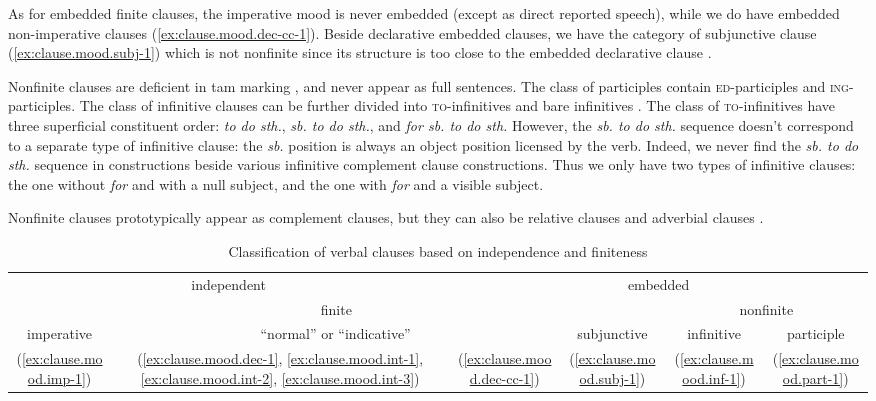 \documentclass[UTF8, a4paper, oneside, scheme=plain, 12pt]{ctexbook}
\newcommand*{\citesec}[1]{\S~{#1}}
\newcommand*{\citechap}[1]{Ch~{#1}}
\newcommand*{\citepage}[1]{p.~{#1}}
\newcommand{\form}[1]{\emph{#1}}
\newcommand{\formcat}[1]{\textsc{#1}}
\begin{document}
As for embedded finite clauses,
the imperative mood is never embedded (except as direct reported speech),
while we do have embedded non-imperative clauses (\ref{ex:clause.mood.dec-cc-1}).
Beside declarative embedded clauses,
we have the category of subjunctive clause (\ref{ex:clause.mood.subj-1})
which is not nonfinite 
since its structure is too close to 
the embedded declarative clause \citep[\citepage{83}]{cgel}. 

Nonfinite clauses are deficient in \acs{tam} marking 
\citep[\citepage{1174}, {[5-7]}]{cgel},
and never appear as full sentences.
The class of participles contain \formcat{ed}-participles and \formcat{ing}-participles.
The class of infinitive clauses can be further divided into 
\formcat{to}-infinitives and bare infinitives \citet[\citechap{14}, \citesec{1.4.3}]{cgel}.
The class of \formcat{to}-infinitives have three superficial constituent order:
\form{to do sth.}, \form{sb. to do sth.}, and \form{for sb. to do sth.}
However, the \form{sb. to do sth.} sequence doesn't correspond to a separate type of infinitive clause:
the \form{sb.} position is always an object position licensed by the verb.
Indeed, we never find the \form{sb. to do sth.} sequence
in constructions beside various infinitive complement clause constructions.
Thus we only have two types of infinitive clauses:
the one without \form{for} and with a null subject,
and the one with \form{for} and a visible subject.

Nonfinite clauses prototypically appear as complement clauses, 
but they can also be relative clauses and adverbial clauses \citep[\citepage{1264}]{cgel}.

\begin{table}[H]
    \caption{Classification of verbal clauses based on independence and finiteness}
    \label{tbl:verbal-clause}
    \centering
    \begin{tabular}{@{}cccccc@{}}
        \toprule
        \multicolumn{2}{c}{independent}            & \multicolumn{4}{c}{ embedded}                                                                \\ \cmidrule(lr){1-2} \cmidrule(lr){3-6}
        \multicolumn{4}{c}{finite}                                                                & \multicolumn{2}{c}{nonfinite}                         \\ \cmidrule(lr){1-4} \cmidrule(lr){5-6}
        imperative               & \multicolumn{2}{c}{``normal'' or ``indicative''} & subjunctive & infinitive           & participle \\ \midrule
        (\ref{ex:clause.mood.imp-1})    &  
        (\ref{ex:clause.mood.dec-1}, \ref{ex:clause.mood.int-1}, \ref{ex:clause.mood.int-2}, \ref{ex:clause.mood.int-3})                 &   
        (\ref{ex:clause.mood.dec-cc-1})         &           
        (\ref{ex:clause.mood.subj-1})                & 
        (\ref{ex:clause.mood.inf-1})  &        
        (\ref{ex:clause.mood.part-1})                       \\ \bottomrule
    \end{tabular}
\end{table}
\end{document}
